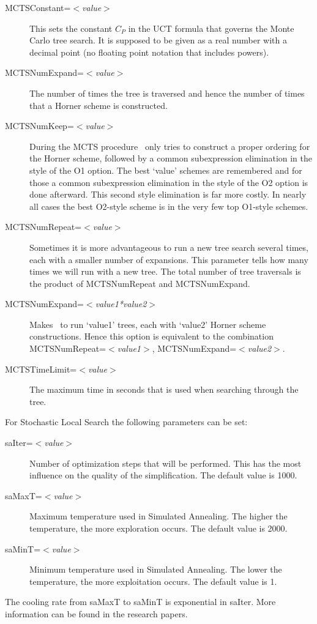 \begin{description}
\item[MCTSConstant=$<$\emph{value}$>$] 
  This sets the constant $C_P$ in the UCT formula that governs 
  the Monte Carlo tree search. It is supposed to be given as a real number 
  with a decimal point (no floating point notation that includes powers).
\item[MCTSNumExpand=$<$\emph{value}$>$] The number of times the tree
  is traversed and hence the number of times that a Horner scheme is
  constructed.
\item[MCTSNumKeep=$<$\emph{value}$>$] 
  During the MCTS procedure \FORM\ only tries to construct 
  a proper ordering for the Horner scheme, followed by a common subexpression 
  elimination in the style of the O1 option. The best `value' schemes are 
  remembered and for those a common subexpression elimination in the style of 
  the O2 option is done afterward. This second style elimination is far more 
  costly. In nearly all cases the best O2-style scheme is in the very few top 
  O1-style schemes.
\item[MCTSNumRepeat=$<$\emph{value}$>$] 
  Sometimes it is more advantageous to run
  a new tree search several times, each with a smaller number of
  expansions. This parameter tells how many times we will run with a
  new tree. The total number of tree traversals is the product of 
  MCTSNumRepeat and MCTSNumExpand.
\item[MCTSNumExpand=$<$\emph{value1*value2}$>$] 
  Makes \FORM\ to run `value1' trees, each with `value2' Horner scheme
  constructions. Hence this option is equivalent to the combination \hfill \\
  MCTSNumRepeat=$<$\emph{value1}$>$, MCTSNumExpand=$<$\emph{value2}$>$.
\item[MCTSTimeLimit=$<$\emph{value}$>$] The maximum time in seconds
  that is used when searching through the tree.
\end{description}

For Stochastic Local Search the following parameters can be set:
\begin{description}
\item[saIter=$<$\emph{value}$>$] Number of optimization steps that will be performed. This has the most influence on the quality of the simplification. The default value is 1000.
\item[saMaxT=$<$\emph{value}$>$] Maximum temperature used in Simulated Annealing. The higher the temperature,
the more exploration occurs. The default value is 2000.
\item[saMinT=$<$\emph{value}$>$] Minimum temperature used in Simulated Annealing. The lower the temperature,
the more exploitation occurs. The default value is 1.
\end{description}
The cooling rate from saMaxT to saMinT is exponential in saIter. More information can be
found in the research papers.

